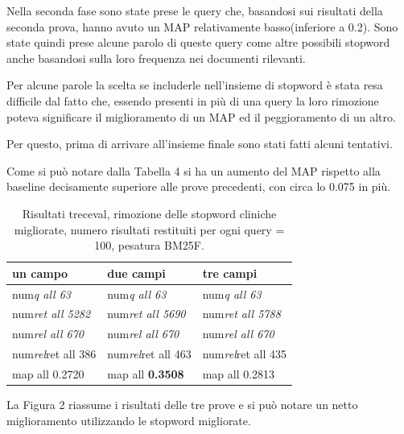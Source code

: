 \documentclass[runningheads]{llncs}
\begin{document}
Nella seconda fase sono state prese le query che, basandosi sui risultati della seconda prova, hanno avuto un MAP relativamente basso(inferiore a 0.2). Sono state quindi prese alcune parolo di queste query come altre possibili stopword anche basandosi sulla loro frequenza nei documenti rilevanti.

Per alcune parole la scelta se includerle nell'insieme di stopword \`e stata resa difficile dal fatto che, essendo presenti in pi\`u di una query la loro rimozione poteva significare il miglioramento di un MAP ed il peggioramento di un altro.

Per questo, prima di arrivare all'insieme finale sono stati fatti alcuni tentativi.




Come si pu\`o notare dalla Tabella 4 si ha un aumento del MAP rispetto alla baseline decisamente superiore alle prove precedenti, con circa lo 0.075 in pi\`u.
\begin{table}
\centering
\begin{tabular}{lll}
\hline
\textbf{ un campo }           & \textbf{ due campi }           & \textbf{ tre campi }            \\ \hline
 num\textit{q all 63 }       &  num\textit{q all 63 }       &  num\textit{q all 63 }        \\
 num\textit{ret all 5282 }  &  num\textit{ret all 5690 }  &  num\textit{ret all 5788 }   \\
 num\textit{rel all 670 }    &  num\textit{rel all 670 }    &  num\textit{rel all 670 }     \\
 num\textit{rel}ret all 386  &  num\textit{rel}ret all 463  &  num\textit{rel}ret all 435   \\
map all 0.2720               & map all \bf 0.3508               & map all 0.2813          \\ \hline
\end{tabular}

\caption{ Risultati treceval, rimozione delle stopword cliniche migliorate, numero risultati restituiti per ogni query = 100, pesatura BM25F.}
\end{table}
\par

La Figura 2 riassume i risultati delle tre prove e si pu\`o notare un netto miglioramento utilizzando le stopword migliorate.
\end{document}

